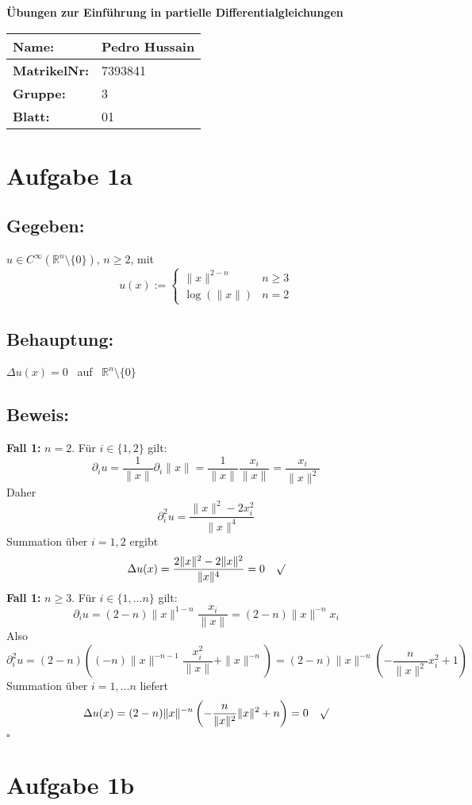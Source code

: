 \documentclass[a4paper, 12pt]{article} %
\newcommand{\makemyblock}[3]{

    \begin{center}
        \Large \textbf{#1} \normalsize
    \end{center}

    \vspace{1cm}

    \begin{flushleft}        
        \begin{tabular}{|l|l|}
            \hline
            \textbf{Name:}       & Pedro Hussain \\
            \hline
            \textbf{MatrikelNr:} & 7393841 \\
            \hline
            \textbf{Gruppe:}     & {#2} \\
            \hline
            \textbf{Blatt:}      & {#3} \\
            \hline
        \end{tabular}
    \end{flushleft}

    \newcommand*{\QEDA}{\null\nobreak\hfill\ensuremath{\blacksquare}}%
    \newcommand*{\QEDB}{\null\nobreak\hfill\ensuremath{\square}}%

}
\begin{document}
\makemyblock{Übungen zur Einführung in partielle Differentialgleichungen}
{3}{01}
\vspace{1cm}

\begin{flushleft}

    \section*{Aufgabe 1a}

    \subsection*{Gegeben:}
    $u \in C^{\infty}(\mathbb{R}^n\setminus\{0\}) $, $n\ge 2$, mit
    $$
        u(x) := \begin{cases}
            \|x\|^{2-n} & n\ge 3 \\
            \log(\|x\|) & n=2
        \end{cases}
    $$

    \subsection*{Behauptung:}
    $\Delta u(x) = 0$ \, auf \, $\mathbb{R}^n\setminus\{0\}$

    \subsection*{Beweis:}
    \textbf{Fall 1:} $n = 2$.
    Für $i \in \{1,2\}$ gilt:
    $$
        \partial_i u = \frac{1}{\|x\|} \partial_i \|x\|
        = \frac{1}{\|x\|} \frac{x_i}{\|x\|}
        = \frac{x_i}{\|x\|^2}
    $$
    Daher
    $$
        \partial^2_i u = \frac{\|x\|^2-2x^2_i}{\|x\|^4}
    $$
    Summation über $i=1,2$ ergibt
    $$
        \Delta u(x) = \frac{2\|x\|^2 - 2\|x\|^2}{\|x\|^4}
        = 0 \quad \surd
    $$
    \textbf{Fall 1:} $n \ge 3$.
    Für $i \in \{1,...n\}$ gilt:
    $$
        \partial_i u = (2-n)\|x\|^{1-n}\frac{x_i}{\|x\|}
        = (2-n)\|x\|^{-n}x_i
    $$
    Also
    $$
        \partial^2_i u = (2-n) \left ((-n)\|x\|^{-n-1}\frac{x^2_i}{\|x\|}+\|x\|^{-n} \right )
        = (2-n) \|x\|^{-n} \left ( -\frac{n}{\|x\|^2} x^2_i + 1 \right )
    $$
    Summation über $i=1,...n$ liefert
    $$
        \Delta u(x) = (2-n) \|x\|^{-n} \left ( -\frac{n}{\|x\|^2} \|x\|^2 + n \right )
        = 0  \quad \surd
    $$
    \QEDB


    \section*{Aufgabe 1b}


\end{flushleft}
\end{document}
